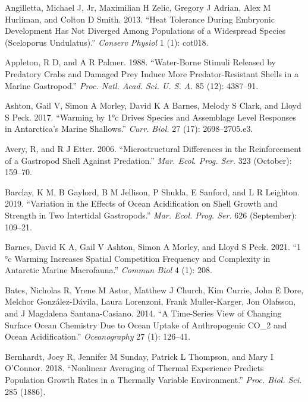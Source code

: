 \documentclass[smallextended]{svjour3}       %
\newlength{\cslhangindent}
\newenvironment{CSLReferences}[2] %
 {%
  \setlength{\parindent}{0pt}
  \ifodd #1 \everypar{\setlength{\hangindent}{\cslhangindent}}\ignorespaces\fi
  \ifnum #2 > 0
  \setlength{\parskip}{#2\baselineskip}
  \fi
 }%
 {}
\begin{document}
\hypertarget{refs}{}
\begin{CSLReferences}{1}{0}
\leavevmode{}%
Angilletta, Michael J, Jr, Maximilian H Zelic, Gregory J Adrian, Alex M
Hurliman, and Colton D Smith. 2013. {``Heat Tolerance During Embryonic
Development Has Not Diverged Among Populations of a Widespread Species
(Sceloporus Undulatus).''} \emph{Conserv Physiol} 1 (1): cot018.

\leavevmode{}%
Appleton, R D, and A R Palmer. 1988. {``Water-Borne Stimuli Released by
Predatory Crabs and Damaged Prey Induce More Predator-Resistant Shells
in a Marine Gastropod.''} \emph{Proc. Natl. Acad. Sci. U. S. A.} 85
(12): 4387--91.

\leavevmode{}%
Ashton, Gail V, Simon A Morley, David K A Barnes, Melody S Clark, and
Lloyd S Peck. 2017. {``Warming by 1°c Drives Species and Assemblage
Level Responses in Antarctica's Marine Shallows.''} \emph{Curr. Biol.}
27 (17): 2698--2705.e3.

\leavevmode{}%
Avery, R, and R J Etter. 2006. {``Microstructural Differences in the
Reinforcement of a Gastropod Shell Against Predation.''} \emph{Mar.
Ecol. Prog. Ser.} 323 (October): 159--70.

\leavevmode{}%
Barclay, K M, B Gaylord, B M Jellison, P Shukla, E Sanford, and L R
Leighton. 2019. {``Variation in the Effects of Ocean Acidification on
Shell Growth and Strength in Two Intertidal Gastropods.''} \emph{Mar.
Ecol. Prog. Ser.} 626 (September): 109--21.

\leavevmode{}%
Barnes, David K A, Gail V Ashton, Simon A Morley, and Lloyd S Peck.
2021. {``1 °c Warming Increases Spatial Competition Frequency and
Complexity in Antarctic Marine Macrofauna.''} \emph{Commun Biol} 4 (1):
208.

\leavevmode{}%
Bates, Nicholas R, Yrene M Astor, Matthew J Church, Kim Currie, John E
Dore, Melchor González-Dávila, Laura Lorenzoni, Frank Muller-Karger, Jon
Olafsson, and J Magdalena Santana-Casiano. 2014. {``A {Time-Series} View
of Changing Surface Ocean Chemistry Due to Ocean Uptake of Anthropogenic
{CO\_2} and Ocean Acidification.''} \emph{Oceanography} 27 (1): 126--41.

\leavevmode{}%
Bernhardt, Joey R, Jennifer M Sunday, Patrick L Thompson, and Mary I
O'Connor. 2018. {``Nonlinear Averaging of Thermal Experience Predicts
Population Growth Rates in a Thermally Variable Environment.''}
\emph{Proc. Biol. Sci.} 285 (1886).


\end{CSLReferences}
\end{document}
